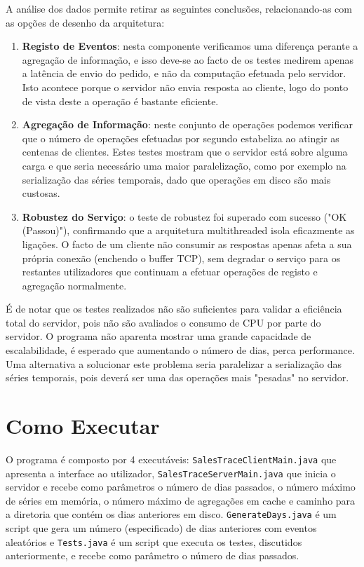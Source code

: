 \documentclass[11pt, a4paper, fleqn]{article}
\begin{document}
	A análise dos dados permite retirar as seguintes conclusões, relacionando-as com as opções de desenho da arquitetura:
	\begin{enumerate}
		\item \textbf{Registo de Eventos}: nesta componente verificamos uma diferença perante a agregação de informação, e isso deve-se ao facto de os testes medirem apenas a latência de envio do pedido, e não da computação efetuada pelo servidor. Isto acontece porque o servidor não envia resposta ao cliente, logo do ponto de vista deste a operação é bastante eficiente.
		\item \textbf{Agregação de Informação}: neste conjunto de operações podemos verificar que o número de operações efetuadas por segundo estabeliza ao atingir as centenas de clientes. Estes testes mostram que o servidor está sobre alguma carga e que seria necessário uma maior paralelização, como por exemplo na serialização das séries temporais, dado que operações em disco são mais custosas.
		\item \textbf{Robustez do Serviço}: o teste de robustez foi superado com sucesso ("OK (Passou)"), confirmando que a arquitetura multithreaded isola eficazmente as ligações. O facto de um cliente não consumir as respostas apenas afeta a sua própria conexão (enchendo o buffer TCP), sem degradar o serviço para os restantes utilizadores que continuam a efetuar operações de registo e agregação normalmente.
	\end{enumerate}
	
	É de notar que os testes realizados não são suficientes para validar a eficiência total do servidor, pois não são avaliados o consumo de CPU por parte do servidor. O programa não aparenta mostrar uma grande capacidade de escalabilidade, é esperado que aumentando o número de dias, perca performance. Uma alternativa a solucionar este problema seria paralelizar a serialização das séries temporais, pois deverá ser uma das operações mais "pesadas" no servidor.
	
	\section{Como Executar}
	
	O programa é composto por 4 executáveis: \texttt{SalesTraceClientMain.java} que apresenta a interface ao utilizador, \texttt{SalesTraceServerMain.java} que inicia o servidor e recebe como parâmetros o número de dias passados, o número máximo de séries em memória, o número máximo de agregações em cache e caminho para a diretoria que contém os dias anteriores em disco. \texttt{GenerateDays.java} é um script que gera um número (especificado) de dias anteriores com eventos aleatórios e \texttt{Tests.java} é um script que executa os testes, discutidos anteriormente, e recebe como parâmetro o número de dias passados.
	
\end{document}
